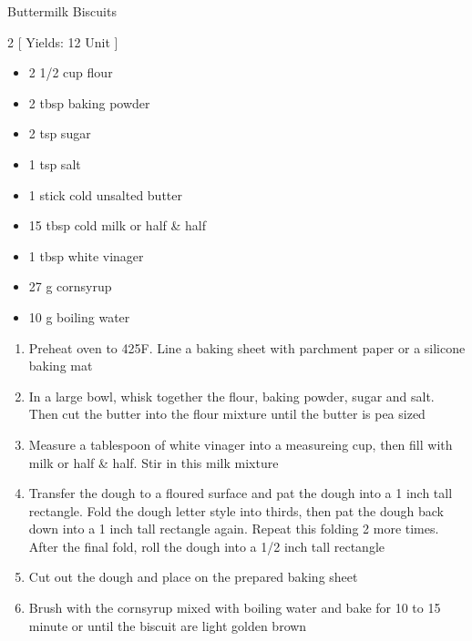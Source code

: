 \begin{Large}
    Buttermilk Biscuits
\end{Large}

\begin{scriptsize}
\begin{multicols}{2}
[
\vspace{1em}
Yields: 12 Unit
\vspace{-1.5em}
]

\begin{itemize}
    \item 2 1/2 cup flour
    \item 2 tbsp baking powder
    \item 2 tsp sugar
    \item 1 tsp salt
    \item 1 stick cold unsalted butter
    \item 15 tbsp cold milk or half \& half
    \item 1 tbsp white vinager
    \item 27 g cornsyrup
    \item 10 g boiling water
\end{itemize}
\end{multicols}
\end{scriptsize}

\begin{footnotesize}
\begin{enumerate}
    \item Preheat oven to 425\degree F. Line a baking sheet with parchment paper or a silicone baking mat
    \item In a large bowl, whisk together the flour, baking powder, sugar and salt. Then cut the butter into the flour mixture until the butter is pea sized
    \item Measure a tablespoon of white vinager into a measureing cup, then fill with milk or half \& half. Stir in this milk mixture
    \item Transfer the dough to a floured surface and pat the dough into a 1 inch tall rectangle. Fold the dough letter style into thirds, then pat the dough back down into a 1 inch tall rectangle again. Repeat this folding 2 more times. After the final fold, roll the dough into a 1/2 inch tall rectangle
    \item Cut out the dough and place on the prepared baking sheet
    \item Brush with the cornsyrup mixed with boiling water and bake for 10 to 15 minute or until the biscuit are light golden brown
\end{enumerate}
\end{footnotesize}

\vspace{2em}

